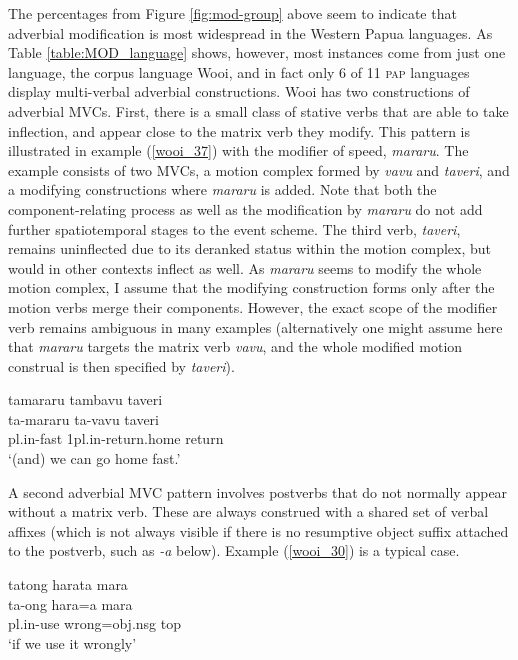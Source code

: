 The percentages from Figure \ref{fig:mod-group} above seem to indicate that adverbial modification is most widespread in the Western Papua languages. As Table \ref{table:MOD_language} shows, however, most instances come from just one language, the corpus language Wooi, and in fact only 6 of 11 \textsc{pap} languages display multi-verbal adverbial constructions. Wooi has two constructions of adverbial MVCs. First, there is a small class of stative verbs that are able to take inflection, and appear close to the matrix verb they modify. This pattern is illustrated in example (\ref{wooi_37}) with the modifier of speed, \textit{mararu}. The example consists of two MVCs, a motion complex formed by \textit{vavu} and \textit{taveri}, and a modifying constructions where \textit{mararu} is added. Note that both the component-relating process as well as the modification by \textit{mararu} do not add further spatiotemporal stages to the event scheme. The third verb, \textit{taveri}, remains uninflected due to its deranked status within the motion complex, but would in other contexts inflect as well. As \textit{mararu} seems to modify the whole motion complex, I assume that the modifying construction forms only after the motion verbs merge their components. However, the exact scope of the modifier verb remains ambiguous in many examples (alternatively one might assume here that \textit{mararu} targets the matrix verb \textit{vavu}, and the whole modified motion construal is then specified by \textit{taveri}).

\ea \label{wooi_37}
\gll tamararu tambavu taveri \\
ta-mararu ta-vavu taveri \\
\acs{pl}.\acs{in}-fast 1\acs{pl}.\acs{in}-return.home return \\
\glft `(and) we can go home fast.' \\ 
\z
\xe

A second adverbial MVC pattern involves postverbs that do not normally appear without a matrix verb. These are always construed with a shared set of verbal affixes (which is not always visible if there is no resumptive object suffix attached to the postverb, such as \textit{-a} below). Example (\ref{wooi_30}) is a typical case.

\ea \label{wooi_30}
\gll tatong harata mara \\
ta-ong hara=a mara \\
\acs{pl}.\acs{in}-use wrong=\acs{obj}.\acs{nsg} \acs{top} \\
\glft `if we use it wrongly' \\ 
\z
\xe

